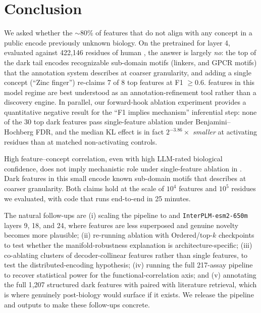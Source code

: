 \section{Conclusion}
\label{sec:conclusion}

We asked whether the $\sim$80\% of \sae features that do not align with any \swissprot concept in a public \plm encode previously unknown biology. On the pretrained \interplm \sae for \esm layer 4, evaluated against 422{,}146 residues of human \swissprot, the answer is largely \emph{no}: the top of the dark tail encodes recognizable sub-domain motifs (\tgekp linkers, \dry and \npxxy GPCR motifs) that the annotation system describes at coarser granularity, and adding a single concept (``Zinc finger'') re-claims 7 of 8 top features at F1 $\geq 0.6$. \sae features in this model regime are best understood as an annotation-refinement tool rather than a discovery engine. In parallel, our forward-hook ablation experiment provides a quantitative negative result for the ``F1 implies mechanism'' inferential step: none of the 30 top dark features pass single-feature ablation under Benjamini--Hochberg FDR, and the median KL effect is in fact $2^{-3.86}\times$ \emph{smaller} at activating residues than at matched non-activating controls.

 High feature--concept correlation, even with high LLM-rated biological confidence, does not imply mechanistic role under single-feature ablation in \esm. Dark features in this small \plm encode known sub-domain motifs that \swissprot describes at coarser granularity. Both claims hold at the scale of $10^4$ \sae features and $10^5$ residues we evaluated, with code that runs end-to-end in 25 minutes.

 The natural follow-ups are (i) scaling the pipeline to \esmlarge and \texttt{InterPLM-esm2-650m} layers 9, 18, and 24, where features are less superposed and genuine novelty becomes more plausible; (ii) re-running ablation with Ordered/top-$k$ \sae checkpoints to test whether the manifold-robustness explanation is architecture-specific; (iii) co-ablating clusters of decoder-collinear features rather than single features, to test the distributed-encoding hypothesis; (iv) running the full 217-assay \proteingym pipeline to recover statistical power for the functional-correlation axis; and (v) annotating the full 1{,}207 structured dark features with \gptfive paired with literature retrieval, which is where genuinely post-\swissprot biology would surface if it exists. We release the pipeline and outputs to make these follow-ups concrete.
